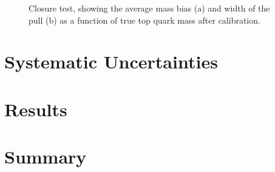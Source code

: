 \begin{figure}[!htp]
   \caption{Closure test, showing the average mass bias (a) and width of the pull (b) as a function of true top quark
            mass after calibration.
   \label{fig:calibrated_bias_pull_vs_mass}}
\end{figure}
 

\section{Systematic Uncertainties}
\label{s_top_mass:systematics}




\section{Results}
\label{s_top_mass:results}

\section{Summary}
\label{s_top_mass:summary}




